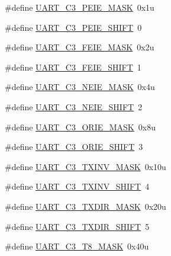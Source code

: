\begin{DoxyCompactItemize}
\item 
\#define \hyperlink{group___u_a_r_t___register___masks_gadf1ad2301848b5812b84658d02cc2006}{U\+A\+R\+T\+\_\+\+C3\+\_\+\+P\+E\+I\+E\+\_\+\+M\+A\+SK}~0x1u
\item 
\#define \hyperlink{group___u_a_r_t___register___masks_gad14f9faaee56b818a04794694960fa6a}{U\+A\+R\+T\+\_\+\+C3\+\_\+\+P\+E\+I\+E\+\_\+\+S\+H\+I\+FT}~0
\item 
\#define \hyperlink{group___u_a_r_t___register___masks_gaf165d0ae5fd464a2ec367e29d1dedcb2}{U\+A\+R\+T\+\_\+\+C3\+\_\+\+F\+E\+I\+E\+\_\+\+M\+A\+SK}~0x2u
\item 
\#define \hyperlink{group___u_a_r_t___register___masks_gac08e14a1c915cfa377176fc6d491e38d}{U\+A\+R\+T\+\_\+\+C3\+\_\+\+F\+E\+I\+E\+\_\+\+S\+H\+I\+FT}~1
\item 
\#define \hyperlink{group___u_a_r_t___register___masks_ga1e485aea10f0176919ae060d0ee1d709}{U\+A\+R\+T\+\_\+\+C3\+\_\+\+N\+E\+I\+E\+\_\+\+M\+A\+SK}~0x4u
\item 
\#define \hyperlink{group___u_a_r_t___register___masks_gae70ab8b995df889314915948d51ae783}{U\+A\+R\+T\+\_\+\+C3\+\_\+\+N\+E\+I\+E\+\_\+\+S\+H\+I\+FT}~2
\item 
\#define \hyperlink{group___u_a_r_t___register___masks_ga85999d87eca30c526580b0d060f2aff5}{U\+A\+R\+T\+\_\+\+C3\+\_\+\+O\+R\+I\+E\+\_\+\+M\+A\+SK}~0x8u
\item 
\#define \hyperlink{group___u_a_r_t___register___masks_ga3e65d9370ba1e2d05042db7ed72e599b}{U\+A\+R\+T\+\_\+\+C3\+\_\+\+O\+R\+I\+E\+\_\+\+S\+H\+I\+FT}~3
\item 
\#define \hyperlink{group___u_a_r_t___register___masks_ga6c9c90706e66f4bfa8fb53dd0407e579}{U\+A\+R\+T\+\_\+\+C3\+\_\+\+T\+X\+I\+N\+V\+\_\+\+M\+A\+SK}~0x10u
\item 
\#define \hyperlink{group___u_a_r_t___register___masks_ga99b840aeb5c25012354a1cd40ec35de7}{U\+A\+R\+T\+\_\+\+C3\+\_\+\+T\+X\+I\+N\+V\+\_\+\+S\+H\+I\+FT}~4
\item 
\#define \hyperlink{group___u_a_r_t___register___masks_gae9909f5ed584e6647deec86775f025e7}{U\+A\+R\+T\+\_\+\+C3\+\_\+\+T\+X\+D\+I\+R\+\_\+\+M\+A\+SK}~0x20u
\item 
\#define \hyperlink{group___u_a_r_t___register___masks_gafd8df440afc872879f09780112122e6a}{U\+A\+R\+T\+\_\+\+C3\+\_\+\+T\+X\+D\+I\+R\+\_\+\+S\+H\+I\+FT}~5
\item 
\#define \hyperlink{group___u_a_r_t___register___masks_gaec915ed2882cf21feb385399e44b5a9b}{U\+A\+R\+T\+\_\+\+C3\+\_\+\+T8\+\_\+\+M\+A\+SK}~0x40u
\item 

\end{DoxyCompactItemize}
